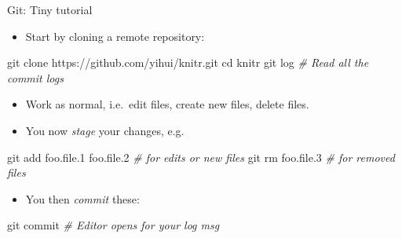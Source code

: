 \documentclass[10pt,ignorenonframetext,]{beamer}
\newenvironment{Shaded}{\begin{snugshade}}{\end{snugshade}}
\newcommand{\BuiltInTok}[1]{#1}
\newcommand{\CommentTok}[1]{\textcolor[rgb]{0.56,0.35,0.01}{\textit{#1}}}
\newcommand{\FunctionTok}[1]{\textcolor[rgb]{0.00,0.00,0.00}{#1}}
\newcommand{\NormalTok}[1]{#1}
\providecommand{\tightlist}{%
  \setlength{\itemsep}{0pt}\setlength{\parskip}{0pt}}
\begin{document}
\begin{frame}[fragile]{Git: Tiny tutorial}
\protect\hypertarget{git-tiny-tutorial}{}

\begin{itemize}
\tightlist
\item
  Start by cloning a remote repository:
\end{itemize}

\begin{Shaded}
\begin{Highlighting}[]
      \FunctionTok{git}\NormalTok{ clone https://github.com/yihui/knitr.git}
      \BuiltInTok{cd}\NormalTok{ knitr}
      \FunctionTok{git}\NormalTok{ log }\CommentTok{# Read all the commit logs}
\end{Highlighting}
\end{Shaded}

\begin{itemize}
\tightlist
\item
  Work as normal, i.e.~edit files, create new files, delete files.
\item
  You now \emph{stage} your changes, e.g.
\end{itemize}

\begin{Shaded}
\begin{Highlighting}[]
      \FunctionTok{git}\NormalTok{ add foo.file.1 foo.file.2 }\CommentTok{# for edits or new files}
      \FunctionTok{git}\NormalTok{ rm foo.file.3 }\CommentTok{# for removed files}
\end{Highlighting}
\end{Shaded}

\begin{itemize}
\tightlist
\item
  You then \emph{commit} these:
\end{itemize}

\begin{Shaded}
\begin{Highlighting}[]
      \FunctionTok{git}\NormalTok{ commit }\CommentTok{# Editor opens for your log msg}
\end{Highlighting}
\end{Shaded}

\end{frame}
\end{document}
